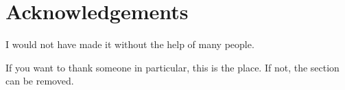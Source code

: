 \newpage%
\cleardoublepage%
\chapter*{Acknowledgements}%
\thispagestyle{empty}%
 
I would not have made it without the help of many people.

\medskip

If you want to thank someone in particular, this is the place. If not, the section can be removed.